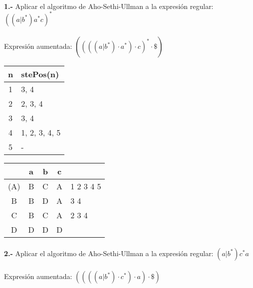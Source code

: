 \documentclass[11pt,a4paper]{report}
\begin{document}
\paragraph{}

\paragraph{}
\textbf{1.-} Aplicar el algoritmo de Aho-Sethi-Ullman a la expresión regular: \textbf{$ ((a|b^*)a^*c)^* $} \\
\\
Expresión aumentada: $ ((((a|b^*)\cdot a^*)\cdot c)^*\cdot \$ ) $ \\

\begin{tabular} {| c | l |}
\hline
n & stePos(n) \\ \hline
1 & 3, 4 \\ \hline
2 & 2, 3, 4 \\ \hline
3 & 3, 4 \\ \hline
4 & 1, 2, 3, 4, 5 \\ \hline
5 & - \\ \hline
\end{tabular}
\quad
\begin{tabular} {| c | c |c |c | l |}
\hline 
& a & b & c & \\ \hline
(A) & B & C & A & 1 2 3 4 5 \\ \hline
B & B & D & A & 3 4 \\ \hline
C & B & C & A & 2 3 4 \\ \hline
D & D & D & D & \\ \hline
\end{tabular}\paragraph{}
\textbf{2.-} Aplicar el algoritmo de Aho-Sethi-Ullman a la expresión regular: \textbf{$ (a|b^*)c^*a $} \\
\\
Expresión aumentada: $ ((((a|b^*)\cdot c^*)\cdot a)\cdot \$ ) $ \\
\end{document}

